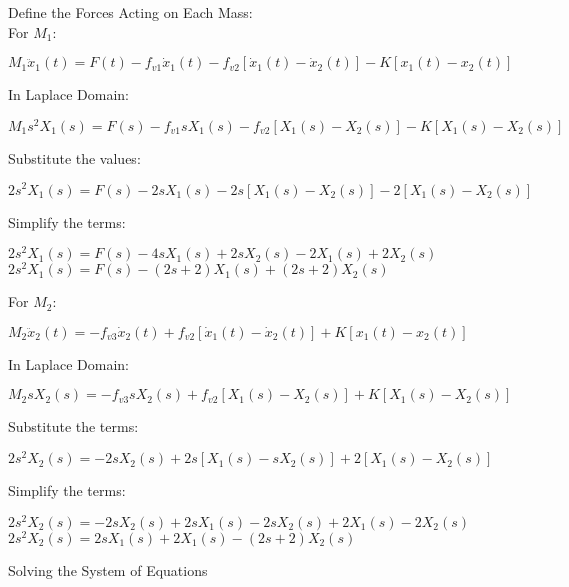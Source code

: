 \documentclass[11pt,letterpaper]{article}
\begin{document}
Define the Forces Acting on Each Mass:\\[12pt]
For $M_1$:\\[12pt]
\begin{center}
	$M_1\ddot{x}_1(t)=F(t)-f_{v1}\dot{x}_1(t)-f_{v2}[\dot{x}_1(t)-\dot{x}_2(t)]-K[x_1(t)-x_2(t)]$\\
\end{center}
In Laplace Domain:\\
\begin{center}
	$M_1s^2X_1(s)=F(s)-f_{v1}sX_1(s)-f_{v2}[X_1(s)-X_2(s)]-K[X_1(s)-X_2(s)]$\\
\end{center}
Substitute the values:\\
\begin{center}
	$2s^2X_1(s)=F(s)-2sX_1(s)-2s[X_1(s)-X_2(s)]-2[X_1(s)-X_2(s)]$\\
\end{center}
Simplify the terms:\\
\begin{center}
	$2s^2X_1(s)=F(s)-4sX_1(s)+2sX_2(s)-2X_1(s)+2X_2(s)$\\[12pt]
	$2s^2X_1(s)=F(s)-(2s+2)X_1(s)+(2s+2)X_2(s)$\\[12pt]
\end{center}
For $M_2$:\\[12pt]
\begin{center}
	$M_2\ddot{x}_2(t)=-f_{v3}\dot{x}_2(t)+f_{v2}[\dot{x}_1(t)-\dot{x}_2(t)]+K[x_1(t)-x_2(t)]$\\
\end{center}
In Laplace Domain:\\
\begin{center}
	$M_2sX_2(s)=-f_{v3}sX_2(s)+f_{v2}[X_1(s)-X_2(s)]+K[X_1(s)-X_2(s)]$\\
\end{center}
Substitute the terms:\\
\begin{center}
	$2s^2X_2(s)=-2sX_2(s)+2s[X_1(s)-sX_2(s)]+2[X_1(s)-X_2(s)]$\\
\end{center}
Simplify the terms:\\
\begin{center}
	$2s^2X_2(s)=-2sX_2(s)+2sX_1(s)-2sX_2(s)+2X_1(s)-2X_2(s)$\\[12pt]
	$2s^2X_2(s)=2sX_1(s)+2X_1(s)-(2s+2)X_2(s)$\\[12pt]
\end{center}
Solving the System of Equations\\[12pt]
\end{document}
